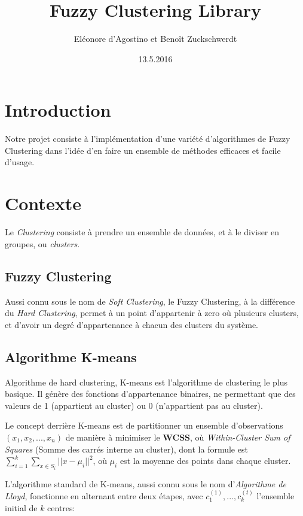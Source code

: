 \documentclass{article}
\title{Fuzzy Clustering Library}
\date{13.5.2016}
\author{Eléonore d'Agostino et Benoît Zuckschwerdt}
\begin{document}
  \maketitle
  \tableofcontents
  \setlength{\parskip}{1em}
  \newpage

  \section{Introduction}

    Notre projet consiste à l'implémentation d'une variété d'algorithmes de Fuzzy Clustering dans l'idée d'en faire un ensemble de méthodes efficaces et facile d'usage.

  \section{Contexte}

    Le \textit{Clustering} consiste à prendre un ensemble de données, et à le diviser en groupes, ou \textit{clusters}.

    \subsection{Fuzzy Clustering}

      Aussi connu sous le nom de \textit{Soft Clustering}, le Fuzzy Clustering, à la différence du \textit{Hard Clustering}, permet à un point d'appartenir à zero où plusieurs clusters, et d'avoir un degré d'appartenance à chacun des clusters du système.

    \subsection{Algorithme K-means}

      Algorithme de hard clustering, K-means est l'algorithme de clustering le plus basique. Il génère des fonctions d'appartenance binaires, ne permettant que des valeurs de 1 (appartient au cluster) ou 0 (n'appartient pas au cluster).

      Le concept derrière K-means est de partitionner un ensemble d'observations $(x_1,x_2,...,x_n)$ de manière à minimiser le \textbf{WCSS}, où \textit{Within-Cluster Sum of Squares} (Somme des carrés interne au cluster), dont la formule est $\sum_{i=1}^{k}\sum_{x\in S_i}||x-\mu_i||^2$, où $\mu_i$ est la moyenne des points dans chaque cluster.

      L'algorithme standard de K-means, aussi connu sous le nom d'\textit{Algorithme de Lloyd}, fonctionne en alternant entre deux étapes, avec $c_1^{(1)},...,c_k^{(t)}$ l'ensemble initial de $k$ centres:
\end{document}
